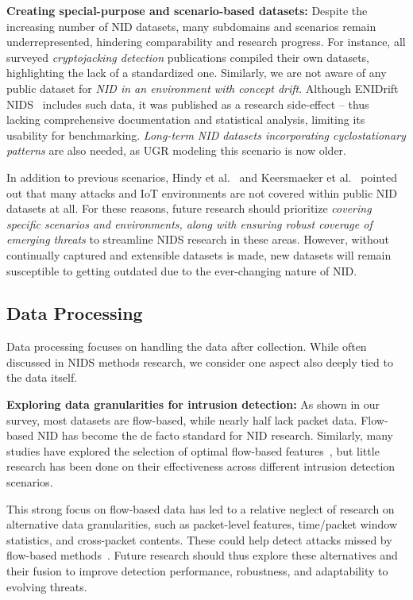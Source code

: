 \textbf{Creating special-purpose and scenario-based datasets:}  Despite the increasing number of NID datasets, many subdomains and scenarios remain underrepresented, hindering comparability and research progress. For instance, all surveyed \emph{cryptojacking detection} publications compiled their own datasets, highlighting the lack of a standardized one. Similarly, we are not aware of any public dataset for \emph{NID in an environment with concept drift}. Although ENIDrift NIDS~\cite{wang2022_enidrift} includes such data, it was published as a research side-effect -- thus lacking comprehensive documentation and statistical analysis, limiting its usability for benchmarking. \emph{Long-term NID datasets incorporating cyclostationary patterns} are also needed, as UGR modeling this scenario is now older.

In addition to previous scenarios, Hindy et al.~\cite{hindy2020_network_threats_taxonomy} and Keersmaeker et al.~\cite{keersmaeker2023_survey_public_iot_datasets} pointed out that many attacks and IoT environments are not covered within public NID datasets at all. For these reasons, future research should prioritize \emph{covering specific scenarios and environments, along with ensuring robust coverage of emerging threats} to streamline NIDS research in these areas. However, without continually captured and extensible datasets is made, new datasets will remain susceptible to getting outdated due to the ever-changing nature of NID.

\subsection{Data Processing}

Data processing focuses on handling the data after collection. While often discussed in NIDS methods research, we consider one aspect also deeply tied to the data itself.

\textbf{Exploring data granularities for intrusion detection:} As shown in our survey, most datasets are flow-based, while nearly half lack packet data. Flow-based NID has become the de facto standard for NID research. Similarly, many studies have explored the selection of optimal flow-based features~\cite{dimauro2021_supervised_fs_nids_review,yin2023_igrf_rfe,turukmane2024_m_multisvm_ftr_select_nids}, but little research has been done on their effectiveness across different intrusion detection scenarios.

This strong focus on flow-based data has led to a relative neglect of research on alternative data granularities, such as packet-level features, time/packet window statistics, and cross-packet contents. These could help detect attacks missed by flow-based methods~\cite{umer2017_flowbased_ids_techniques}. Future research should thus explore these alternatives and their fusion to improve detection performance, robustness, and adaptability to evolving threats.

